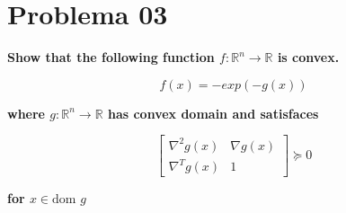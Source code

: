 \section*{Problema 03}

\textbf{Show that the following function $f: \mathbb{R}^n \rightarrow \mathbb{R}$ is convex.}

\begin{equation*}
    f(x) = -exp(-g(x))
\end{equation*}

\textbf{where $g:\mathbb{R}^n \rightarrow \mathbb{R}$ has convex domain and satisfaces}

\begin{equation*}
    \begin{bmatrix}
        \nabla^2 g(x) & \nabla g(x) \\
        \nabla^T g(x) & 1
    \end{bmatrix} \succeq 0
\end{equation*}

\textbf{for $x \in \text{dom } g$}
